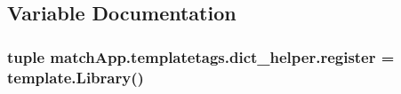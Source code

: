 \subsection{Variable Documentation}
\hypertarget{namespacematch_app_1_1templatetags_1_1dict__helper_a02b3a251b23b34e7067053c9792f5651}{}
\subsubsection[{register}]{\setlength{\rightskip}{0pt plus 5cm}tuple match\+App.\+templatetags.\+dict\+\_\+helper.\+register = template.\+Library()}\label{namespacematch_app_1_1templatetags_1_1dict__helper_a02b3a251b23b34e7067053c9792f5651}
